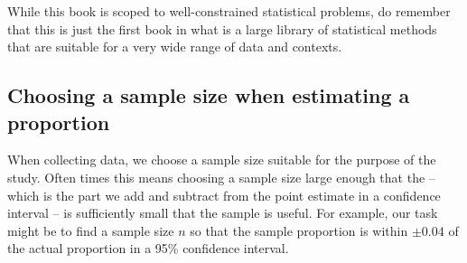 While this book is scoped to well-constrained statistical
problems, do remember that this is just the first
book in what is a large library of statistical methods that
are suitable for a very wide range of data and contexts.


\D{\newpage}

\subsection{Choosing a sample size when estimating a proportion}


When collecting data, we choose a sample size suitable
for the purpose of the study.
Often times this means choosing a sample size large
enough that the  --
which is the part we add and subtract from the point
estimate in a confidence interval --
is sufficiently small that the sample is useful.
For example, our task might be to find a sample size
$n$ so that the sample proportion is within $\pm 0.04$
of the actual proportion in a 95\% confidence interval.




